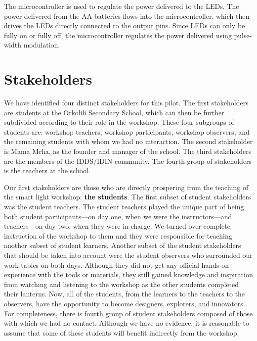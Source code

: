\documentclass[11pt, twocolumn]{article}
\begin{document}
The microcontroller is used to regulate the power delivered to the LEDs. The power delivered from the AA batteries flows into the microcontroller, which then drives the LEDs directly connected to the output pins. Since LEDs can only be fully on or fully off, the microcontroller regulates the power delivered using pulse-width modulation.
\section*{Stakeholders}
We have identified four distinct stakeholders for this pilot. The first stakeholders are students at the Orkolili Secondary School, which can then be further subdivided according to their role in the workshop. These four subgroups of students are: workshop teachers, workshop participants, workshop observers, and the remaining students with whom we had no interaction. The second stakeholder is Mama Mcha, as the founder and manager of the school. The third stakeholders are the members of the IDDS/IDIN community. The fourth group of stakeholders is the teachers at the school.

Our first stakeholders are those who are directly prospering from the teaching of the smart light workshop: \textbf{the students}. The first subset of student stakeholders was the student teachers. The student teachers played the unique part of being both student participants—on day one, when we were the instructors—and teachers—on day two, when they were in charge. We turned over complete instruction of the workshop to them and they were responsible for teaching another subset of student learners. Another subset of the student stakeholders that should be taken into account were the student observers who surrounded our work tables on both days. Although they did not get any official hands-on experience with the tools or materials, they still gained knowledge and inspiration from watching and listening to the workshop as the other students completed their lanterns. Now, all of the students, from the learners to the teachers to the observers, have the opportunity to become designers, explorers, and innovators. For completeness, there is fourth group of student stakeholders composed of those with which we had no contact. Although we have no evidence, it is reasonable to assume that some of these students will benefit indirectly from the workshop.
\end{document}
